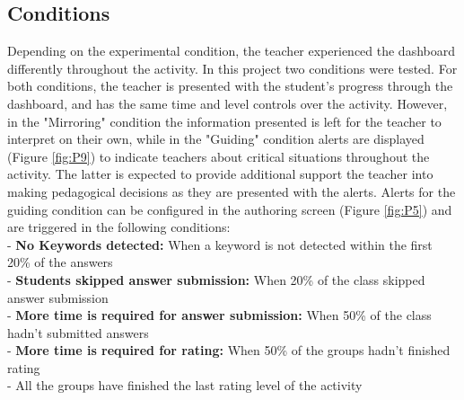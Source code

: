 \subsection{Conditions} \label{conditions}
Depending on the experimental condition, the teacher experienced the dashboard differently throughout the activity. In this project two conditions were tested. For both conditions, the teacher is presented with the student's progress through the dashboard, and has the same time and level controls over the activity. However, in the "Mirroring" condition the information presented is left for the teacher to interpret on their own, while in the "Guiding" condition alerts are displayed (Figure \ref{fig:P9}) to indicate teachers about critical situations throughout the activity. The latter is expected to provide additional support the teacher into making pedagogical decisions as they are presented with the alerts. Alerts for the guiding condition can be configured in the authoring screen (Figure \ref{fig:P5}) and are triggered in the following conditions:\\
- \textbf{No Keywords detected:} When a keyword is not detected within the first 20\% of the answers\\
- \textbf{Students skipped answer submission:} When 20\% of the class skipped answer submission\\
- \textbf{More time is required for answer submission:} When 50\% of the class hadn’t submitted answers\\
- \textbf{More time is required for rating:} When 50\% of the groups hadn’t finished rating\\
- All the groups have finished the last rating level of the activity\\
